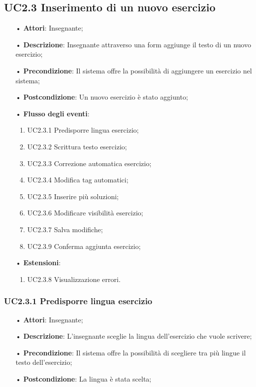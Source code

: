\subsection{UC2.3 Inserimento di un nuovo esercizio}
\begin{itemize}
	\item[•] \textbf{Attori}: Insegnante;
	\item[•] \textbf{Descrizione}: Insegnante attraverso una form aggiunge il testo di un nuovo esercizio;
	\item[•] \textbf{Precondizione}: Il sistema offre la possibilità di aggiungere un esercizio nel sistema;
	\item[•] \textbf{Postcondizione}: Un nuovo esercizio è stato aggiunto;
	\item[•] \textbf{Flusso degli eventi}:
	\begin{enumerate}
		\item UC2.3.1 Predisporre lingua esercizio;
		\item UC2.3.2 Scrittura testo esercizio;
		\item UC2.3.3 Correzione automatica esercizio;
		\item UC2.3.4 Modifica tag automatici;
		\item UC2.3.5 Inserire più soluzioni;
		\item UC2.3.6 Modificare visibilità esercizio;
		\item UC2.3.7 Salva modifiche;
		\item UC2.3.9 Conferma aggiunta esercizio;
	\end{enumerate}
	\item[•] \textbf{Estensioni}:	
	\begin{enumerate}
		\item UC2.3.8 Visualizzazione errori.
	\end{enumerate}
\end{itemize}

\subsubsection{UC2.3.1 Predisporre lingua esercizio}
\begin{itemize}
	\item[•] \textbf{Attori}: Insegnante;
	\item[•] \textbf{Descrizione}: L'insegnante sceglie la lingua dell’esercizio che vuole scrivere;
	\item[•] \textbf{Precondizione}: Il sistema offre la possibilità di scegliere tra più lingue il testo 
			dell’esercizio;
	\item[•] \textbf{Postcondizione}: La lingua è stata scelta;
\end{itemize}

